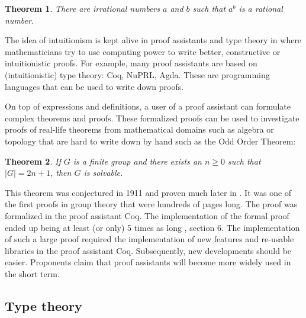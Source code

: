 \documentclass[12pt,a4paper,twoside,xetex]{book}
\newtheorem{theorem}{Theorem}[section]
\begin{document}
\begin{theorem}
  There are irrational numbers $a$ and $b$ such that $a^b$ is a rational number.
\end{theorem} 

The idea of intuitionism is kept alive in proof assistants and type theory in where mathematicians try to use computing power to write better, constructive or intuitionistic proofs. For example, many proof assistants are based on (intuitionistic) type theory: Coq, NuPRL, Agda. These are programming languages that can be used to write down proofs.

On top of expressions and definitions, a user of a proof assistant can formulate complex theorems and proofs. These formalized proofs can be used to investigate proofs of real-life theorems from mathematical domains such as algebra or topology that are hard to write down by hand such as the Odd Order Theorem:

\begin{theorem}
If $G$ is a finite group and there exists an $n \geq 0$ such that $|G| = 2n+1$, then $G$ is solvable.
\end{theorem}

This theorem was conjectured in 1911 and proven much later in \cite{Feit1963}. It was one of the first proofs in group theory that were hundreds of pages long. The proof was formalized in the proof assistant Coq. The implementation of the formal proof ended up being at least (or only) 5 times as long \cite{Gonthier2013}, section 6. The implementation of such a large proof required the implementation of new features and re-usable libraries in the proof assistant Coq. Subsequently, new developments should be easier. Proponents claim that proof assistants will become more widely used in the short term.






\subsection{Type theory}
\end{document}
